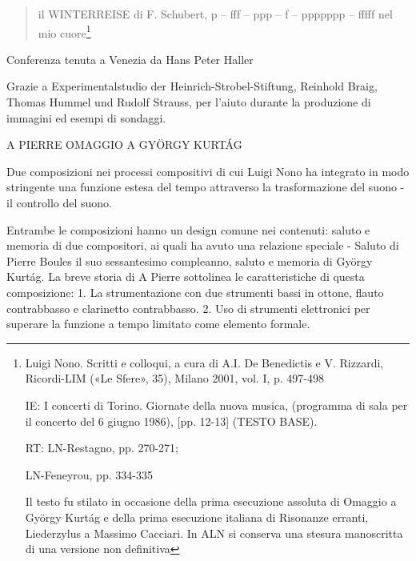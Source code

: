 \begin{quote}
il WINTERREISE di F. Schubert, p – fff – ppp – f – ppppppp – fffff nel mio cuore\footnote{Luigi Nono. Scritti e colloqui, a cura di A.I. De Benedictis e V. Rizzardi, Ricordi-LIM («Le Sfere», 35), Milano 2001, vol. I, p. 497-498

IE: I concerti di Torino. Giornate della nuova musica, (programma di sala per il concerto del 6 giugno 1986), [pp. 12-13] (TESTO BASE).

RT: LN-Restagno, pp. 270-271;

LN-Feneyrou, pp. 334-335

Il testo fu stilato in occasione della prima esecuzione assoluta di Omaggio a György Kurtág e della prima esecuzione italiana di Risonanze erranti, Liederzylus a Massimo Cacciari. In ALN si conserva una stesura manoscritta di una versione non definitiva}

\end{quote}

%

Conferenza tenuta a Venezia da Hans Peter Haller 

Grazie a Experimentalstudio der Heinrich-Strobel-Stiftung, Reinhold Braig, Thomas Hummel und Rudolf Strauss, per l'aiuto durante la produzione di immagini ed esempi di sondaggi. 


A PIERRE
OMAGGIO A GYÖRGY KURTÁG 

Due composizioni nei processi compositivi di cui Luigi Nono ha integrato in modo stringente una funzione estesa del tempo attraverso la trasformazione del suono - il controllo del suono. 

Entrambe le composizioni hanno un design comune nei contenuti: saluto e memoria di due compositori, ai quali ha avuto una relazione speciale - Saluto di Pierre Boules il suo sessantesimo compleanno, saluto e memoria di György Kurtág. 
La breve storia di A Pierre sottolinea le caratteristiche di questa composizione: 
1. La strumentazione con due strumenti bassi in ottone, flauto contrabbasso e clarinetto contrabbasso. 
2. Uso di strumenti elettronici per superare la funzione a tempo limitato come elemento formale. 

